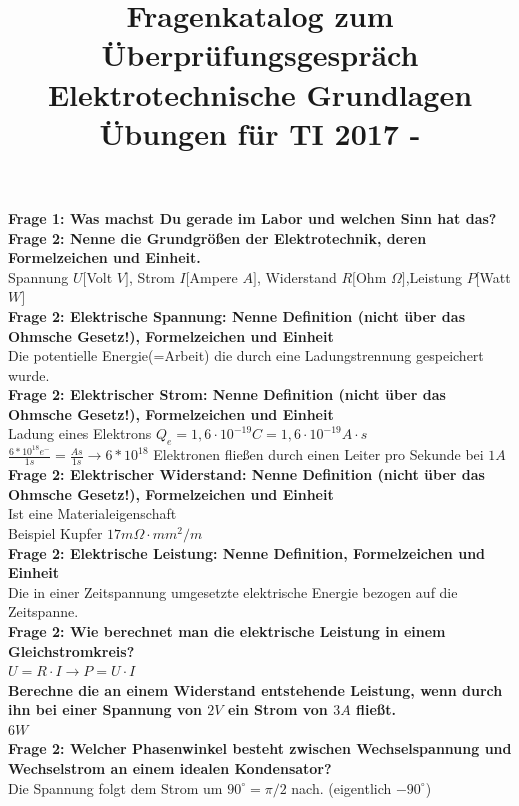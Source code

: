 \documentclass[11pt,a4paper]{scrartcl}
\title{\textbf{Fragenkatalog zum Überprüfungsgespräch Elektrotechnische Grundlagen Übungen für TI 2017 - \UE}}
\author{\name}
\begin{document}
\maketitle

\textbf{Frage 1: Was machst Du gerade im Labor und welchen Sinn hat das?}\\
\textbf{Frage 2: Nenne die Grundgrößen der Elektrotechnik, deren Formelzeichen und Einheit.}\\
Spannung $U[$Volt $V]$, Strom $I[$Ampere $A]$, Widerstand $R[$Ohm $\Omega]$,Leistung $P[$Watt $W]$\\
\textbf{Frage 2: Elektrische Spannung: Nenne Definition (nicht über das Ohmsche Gesetz!), Formelzeichen und Einheit}\\
Die potentielle Energie(=Arbeit) die durch eine Ladungstrennung gespeichert wurde.\\
\textbf{Frage 2: Elektrischer Strom: Nenne Definition (nicht über das Ohmsche Gesetz!), Formelzeichen und Einheit}\\
Ladung eines Elektrons $Q_e=1,6 \cdot 10^{-19}C=1,6 \cdot 10^{-19}A\cdot s$\\
$\frac{6*10^{18}e^-}{1s}=\frac{As}{1s} \rightarrow 6*10^{18}$ Elektronen fließen durch einen Leiter pro Sekunde bei $1A$\\
\textbf{Frage 2: Elektrischer Widerstand: Nenne Definition (nicht über das Ohmsche Gesetz!), Formelzeichen und Einheit}\\
Ist eine Materialeigenschaft\\
Beispiel Kupfer $17m\Omega \cdot mm^2/m$\\
\textbf{Frage 2: Elektrische Leistung: Nenne Definition, Formelzeichen und Einheit}\\
Die in einer Zeitspannung umgesetzte elektrische Energie bezogen auf die Zeitspanne.\\
\textbf{Frage 2: Wie berechnet man die elektrische Leistung in einem Gleichstromkreis?}\\
$U=R \cdot I \rightarrow P=U \cdot I$\\
\textbf{Berechne die an einem Widerstand entstehende Leistung, wenn durch ihn bei einer Spannung von $2V$ ein Strom von $3A$ fließt.}\\
$6W$\\
\textbf{Frage 2: Welcher Phasenwinkel besteht zwischen Wechselspannung und Wechselstrom an einem idealen Kondensator?}\\
Die Spannung folgt dem Strom um $90^\circ=\pi/2$ nach. (eigentlich $-90^\circ$)\\
\end{document}
